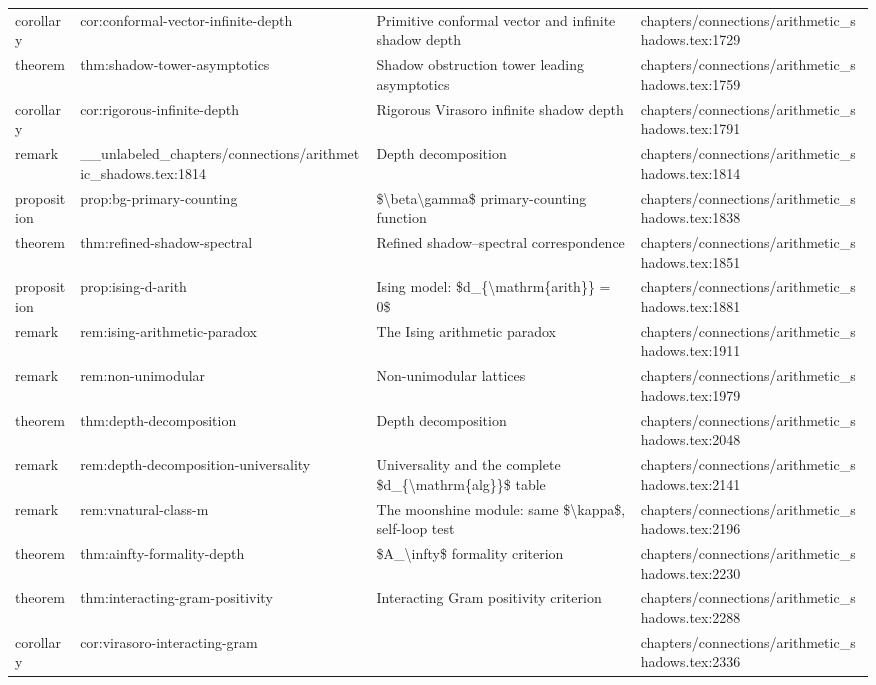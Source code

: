 \documentclass[11pt]{article}
\begin{document}
\begin{longtable}{L{0.10\textwidth}L{0.26\textwidth}L{0.42\textwidth}L{0.22\textwidth}}
corollary & cor:conformal-vector-infinite-depth & Primitive conformal vector and infinite shadow depth & chapters/connections/arithmetic\_shadows.tex:1729\\
theorem & thm:shadow-tower-asymptotics & Shadow obstruction tower leading asymptotics & chapters/connections/arithmetic\_shadows.tex:1759\\
corollary & cor:rigorous-infinite-depth & Rigorous Virasoro infinite shadow depth & chapters/connections/arithmetic\_shadows.tex:1791\\
remark & \_\_unlabeled\_chapters/connections/arithmetic\_shadows.tex:1814 & Depth decomposition & chapters/connections/arithmetic\_shadows.tex:1814\\
proposition & prop:bg-primary-counting & \$\textbackslash{}beta\textbackslash{}gamma\$ primary-counting function & chapters/connections/arithmetic\_shadows.tex:1838\\
theorem & thm:refined-shadow-spectral & Refined shadow--spectral correspondence & chapters/connections/arithmetic\_shadows.tex:1851\\
proposition & prop:ising-d-arith & Ising model: \$d\_\{\textbackslash{}mathrm\{arith\}\} = 0\$ & chapters/connections/arithmetic\_shadows.tex:1881\\
remark & rem:ising-arithmetic-paradox & The Ising arithmetic paradox & chapters/connections/arithmetic\_shadows.tex:1911\\
remark & rem:non-unimodular & Non-unimodular lattices & chapters/connections/arithmetic\_shadows.tex:1979\\
theorem & thm:depth-decomposition & Depth decomposition & chapters/connections/arithmetic\_shadows.tex:2048\\
remark & rem:depth-decomposition-universality & Universality and the complete \$d\_\{\textbackslash{}mathrm\{alg\}\}\$ table & chapters/connections/arithmetic\_shadows.tex:2141\\
remark & rem:vnatural-class-m & The moonshine module: same \$\textbackslash{}kappa\$, self-loop test & chapters/connections/arithmetic\_shadows.tex:2196\\
theorem & thm:ainfty-formality-depth & \$A\_\textbackslash{}infty\$ formality criterion & chapters/connections/arithmetic\_shadows.tex:2230\\
theorem & thm:interacting-gram-positivity & Interacting Gram positivity criterion & chapters/connections/arithmetic\_shadows.tex:2288\\
corollary & cor:virasoro-interacting-gram &  & chapters/connections/arithmetic\_shadows.tex:2336\\

\end{longtable}
\end{document}
